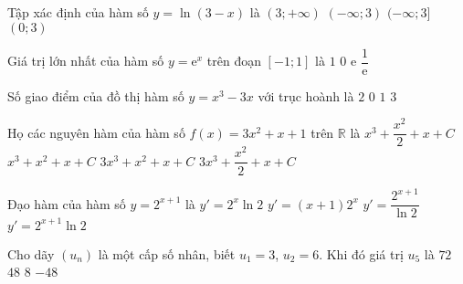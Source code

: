\begin{ex}%
Tập xác định của hàm số $y=\ln (3-x)$ là
\choice
{$(3;+\infty)$}
{\True $(-\infty; 3)$}
{$(-\infty; 3]$}
{$(0; 3)$}
\end{ex}

\begin{ex}%
Giá trị lớn nhất của hàm số $y=\mathrm{e}^x$ trên đoạn $[-1; 1]$ là
\choice
{$1$}
{$0$}
{\True $\mathrm{e}$}
{$\dfrac{1}{\mathrm{e}}$}
\end{ex}

\begin{ex}%
Số giao điểm của đồ thị hàm số $y=x^3-3x$ với trục hoành là
\choice
{$2$}
{$0$}
{$1$}
{\True $3$} 
\end{ex}

\begin{ex}%
Họ các nguyên hàm của hàm số $f(x)=3x^2+x+1$ trên $\mathbb{R}$ là
\choice
{\True $x^3+\dfrac{x^2}{2}+x+C$}
{$x^3+x^2+x+C$}
{$3 x^3+x^2+x+C$}
{$3 x^3+\dfrac{x^2}{2}+x+C$}
\end{ex}

\begin{ex}%
Đạo hàm của hàm số $y=2^{x+1}$ là
\choice
{$y'=2^x\ln 2$}
{$y'=(x+1) 2^x$}
{$y'=\dfrac{2^{x+1}}{\ln 2}$}
{\True $y'=2^{x+1}\ln 2$}
\end{ex}

\begin{ex}%
Cho dãy $(u_n)$ là một cấp số nhân, biết $u_{1}=3$, $u_2=6$. Khi đó giá trị $u_5$ là
\choice
{$72$ }
{\True $48$}
{$8$}
{$-48$}
\end{ex}

